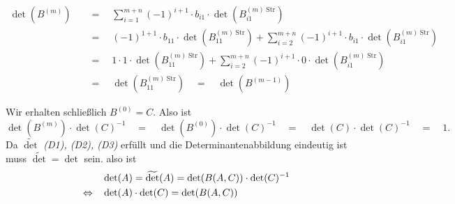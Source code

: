 \documentclass{article}
\newcommand{\equ}{\mathbb{\Leftrightarrow}}
\newcommand{\eq}{\mathbb{\quad = \quad}}
\newcommand{\movs}[2]{\overset{\text{\tiny $#1$}}{\quad #2 \quad}}
\begin{document}
\begin{align*}
  \det(B^{(m)})
  &\eq
  \sum_{i=1}^{m+n} (-1)^{i+1} \cdot b_{i1} \cdot \det(B^{(m)\;\text{Str}}_{i1})\\
  &\eq
  (-1)^{1+1} \cdot b_{11} \cdot \det(B^{(m)\;\text{Str}}_{11}) + \sum_{i=2}^{m+n} (-1)^{i+1} \cdot b_{i1} \cdot \det(B^{(m)\;\text{Str}}_{i1}) \\
  &\eq
  1 \cdot 1 \cdot \det(B^{(m)\;\text{Str}}_{11}) + \sum_{i=2}^{m+n} (-1)^{i+1} \cdot 0 \cdot \det(B^{(m)\;\text{Str}}_{i1})\\
  &\eq
  \det(B^{(m)\;\text{Str}}_{11}) \quad = \quad \det(B^{(m-1)})
\end{align*}




Wir erhalten schließlich
$B^{(0)} = C$.
Also ist
$$\det(B^{(m)}) \cdot \det(C)^{-1}
\eq \det(B^{(0)}) \cdot \det(C)^{-1}
\eq \det(C) \cdot \det(C)^{-1}
\eq 1.$$
Da
$\widetilde{\det}$
\textit{(D1), (D2), (D3)}
erfüllt und die Determinantenabbildung eindeutig ist muss
$\widetilde{\det} = \det$ sein.
also ist
\begin{align*}
  & \det(A) = \widetilde{\det}(A) = \det(B(A, C)) \cdot \det(C)^{-1} \\
  \movs{}{\equ}
  & \det(A) \cdot \det(C) = \det(B(A, C))
\end{align*}
\end{document}
